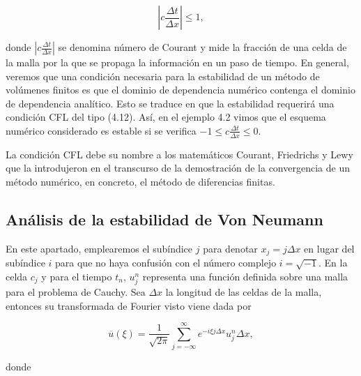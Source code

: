 \begin{equation*}
  \left|
  c\frac{\Delta t}{\Delta x}
  \right|\leq
  1,
\end{equation*}

donde
\begin{math}
  \left|
  c\frac{\Delta t}{\Delta x}
  \right|
\end{math}
se denomina número de Courant y mide la fracción de una celda de la
malla por la que se propaga la información en un paso de tiempo.
En general, veremos que una condición necesaria para la estabilidad
de un método de volúmenes finitos es que el dominio de dependencia
numérico contenga el dominio de dependencia analítico.
Esto se traduce en que la estabilidad requerirá una condición CFL del tipo
(4.12).
Así, en el ejemplo 4.2 vimos que el esquema numérico considerado es estable si
se verifica
\begin{math}
  -1\leq
  c\frac{\Delta t}{\Delta x}\leq
  0
\end{math}.

La condición CFL debe su nombre a los matemáticos Courant, Friedrichs
y Lewy que la introdujeron en el transcurso de la demostración de la
convergencia de un método numérico, en concreto, el método de diferencias finitas.

\subsection{Análisis de la estabilidad de Von Neumann}

En este apartado, emplearemos el subíndice $j$ para denotar
$x_{j}=j\Delta x$ en lugar del subíndice $i$ para que no haya
confusión con el número complejo $i=\sqrt{-1}$.
En la celda $c_{j}$ y para el tiempo $t_{n}$, $u^{n}_{j}$ representa
una función definida sobre una malla para el problema de Cauchy.
Sea $\Delta x$ la longitud de las celdas de la malla,
entonces su transformada de Fourier visto viene dada por

\begin{equation*}
  \overline{u}
  \left(\xi\right)=
  \frac{1}{\sqrt{2\pi}}
  \sum_{j=-\infty}^{\infty}
  e^{-i\xi j\Delta x}
  u^{n}_{j}\Delta x,
\end{equation*}

donde